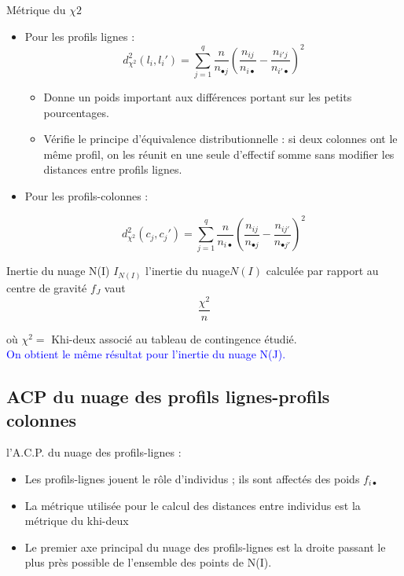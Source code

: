 \documentclass[12pt]{beamer}
\begin{document}
\begin{frame}{Métrique du $\chi 2$}

\begin{itemize}
\item Pour les profils lignes :\\

$$d^2_{\chi^2}(l_i,l_i')=\sum_{j=1}^{q}\frac{n}{n_{\bullet j}}(\frac{n_{ij}}{n_{i \bullet}}-\frac{n_{i'j}}{n_{i' \bullet}})^2  $$

\begin{itemize}
\item Donne un poids important aux différences portant sur les
petits pourcentages.
\item  Vérifie le principe d’équivalence distributionnelle : si deux
colonnes ont le même profil, on les réunit en une seule
d’effectif somme sans modifier les distances entre profils lignes.
\end{itemize}

\item Pour les profils-colonnes :

$$d^2_{\chi^2}(c_j,c_j')=\sum_{j=1}^{q}\frac{n}{n_{i \bullet }}(\frac{n_{ij}}{n_{\bullet j}}-\frac{n_{ij'}}{n_{ \bullet j'}})^2  $$       
       
\end{itemize}
\end{frame}
\begin{frame}{Inertie du nuage N(I)}
$I_{N(I)}$  l’inertie du nuage$ N(I)$ calculée par rapport
au centre de gravité $f_J$ vaut $$\frac{\chi^2}{n}$$

où $\chi^2=$ Khi-deux associé au tableau de contingence étudié.\\

\textcolor{blue}{On obtient le même résultat pour l’inertie du nuage N(J).}

\end{frame}
\subsection{ACP du nuage des profils lignes-profils colonnes }
\begin{frame}{l’A.C.P. du nuage des profils-lignes :}
\begin{itemize}

\item Les profils-lignes jouent le rôle d’individus ; ils sont
affectés des poids $f_{i\bullet}$
\item La métrique utilisée pour le calcul des distances entre
individus est la métrique du khi-deux

\item Le premier axe principal du nuage des profils-lignes est la droite passant le plus près possible de l'ensemble des points
de N(I).
\end{itemize}
\end{frame}
\end{document}
